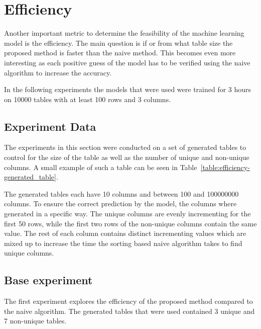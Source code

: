 \section{Efficiency}\label{sec:efficiency}
Another important metric to determine the feasibility of the machine learning model is the efficiency. The main question is if or from what table size the proposed method is faster than the naive method. This becomes even more interesting as each positive guess of the model has to be verified using the naive algorithm to increase the accuracy. %

In the following experiments the models that were used were trained for \num{3} hours on \num{10000} tables with at least \num{100} rows and \num{3} columns. %

\subsection{Experiment Data}\label{subsec:efficiency-experiment_data}
The experiments in this section were conducted on a set of generated tables to control for the size of the table as well as the number of unique and non-unique columns. A small example of such a table can be seen in Table~\ref{table:efficiency-generated_table}.

The generated tables each have \num{10} columns and between \num{100} and \num{100000000} columns. To ensure the correct prediction by the model, the columns where generated in a specific way.
The unique columns are evenly incrementing for the first \num{50} rows, while the first two rows of the non-unique columns contain the same value. The rest of each column contains distinct incrementing values which are mixed up to increase the time the sorting based naive algorithm takes to find unique columns. %




\subsection{Base experiment}\label{subsec:efficiency-base_experiment}
The first experiment explores the efficiency of the proposed method compared to the naive algorithm. The generated tables that were used contained \num{3} unique and \num{7} non-unique tables.

